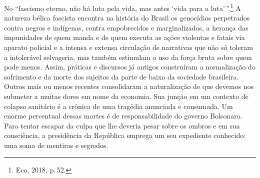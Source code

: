 No ``fascismo eterno, não há luta pela vida, mas antes `vida para a
luta'\,''.\footnote{Eco, 2018, p.\,52.} A natureza bélica fascista encontra
na história do Brasil os genocídios perpetrados contra negros e
indígenas, contra empobrecidos e marginalizados, a herança das
impunidades de quem manda e de quem executa as ações violentas e fatais
via aparato policial e a intensa e extensa circulação de narrativas que
não só toleram a intolerável selvageria, mas também estimulam o uso da
força bruta sobre quem pode menos. Assim, práticas e discursos já
antigos construíram a normalização do sofrimento e da morte dos sujeitos
da parte de baixo da sociedade brasileira. Outros mais ou menos recentes
consolidaram a naturalização de que devemos nos submeter a muitas dores
em nome da economia. Sua junção em um contexto de colapso sanitário é a
crônica de uma tragédia anunciada e consumada. Um enorme percentual
dessas mortes é de responsabilidade do governo Bolsonaro. Para tentar
escapar da culpa que lhe deveria pesar sobre os ombros e em sua
consciência, a presidência da República emprega um seu expediente
conhecido: uma soma de mentiras e segredos.


